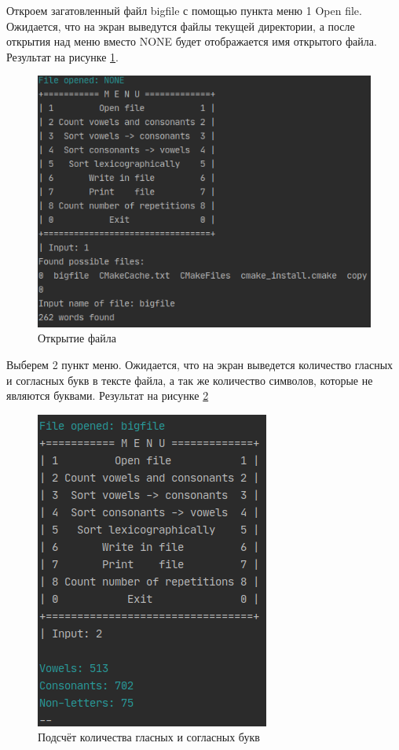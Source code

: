 \documentclass[12pt,a4paper]{article}  %
\begin{document}
Откроем загатовленный файл bigfile с помощью пункта меню 1 Open file. Ожидается, что на экран выведутся файлы текущей директории, а после открытия над меню вместо NONE будет отображается имя открытого файла. Результат на рисунке \ref{open}.
\begin{figure}[htp!]
	\centering
	\includegraphics[width=0.7\linewidth]{photo/tests/open}
	\caption{Открытие файла}
	\label{open}
\end{figure}

Выберем 2 пункт меню. Ожидается, что на экран выведется количество гласных и согласных букв в тексте файла, а так же количество символов, которые не являются буквами. Результат на рисунке \ref{countvc}
\begin{figure}[htp!]
	\centering
	\includegraphics[width=0.5\linewidth]{photo/tests/countvc}
	\caption{Подсчёт количества гласных и согласных букв}
	\label{countvc}
\end{figure}
\end{document}
